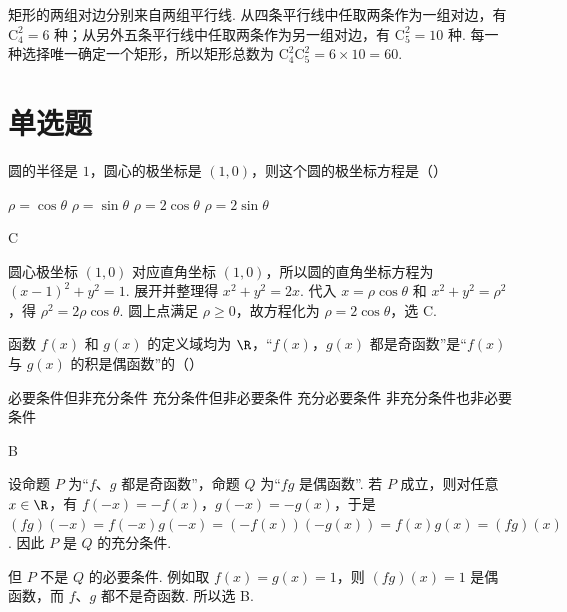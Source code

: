 \begin{solution}
矩形的两组对边分别来自两组平行线. 从四条平行线中任取两条作为一组对边，有 \(\mathrm C_4^2=6\) 种；从另外五条平行线中任取两条作为另一组对边，有 \(\mathrm C_5^2=10\) 种. 每一种选择唯一确定一个矩形，所以矩形总数为 \(\mathrm C_4^2\mathrm C_5^2=6\times10=60\).
\end{solution}

\section{单选题}

\begin{problem}
圆的半径是 \(1\)，圆心的极坐标是 \((1,0)\)，则这个圆的极坐标方程是（\quad）

\choices
    {\(\rho=\cos\theta\)}
    {\(\rho=\sin\theta\)}
    {\(\rho=2\cos\theta\)}
    {\(\rho=2\sin\theta\)}
\end{problem}

\begin{answer}
C
\end{answer}

\begin{solution}
圆心极坐标 \((1,0)\) 对应直角坐标 \((1,0)\)，所以圆的直角坐标方程为 \(\left(x-1\right)^2+y^2=1\). 展开并整理得 \(x^2+y^2=2x\). 代入 \(x=\rho\cos\theta\) 和 \(x^2+y^2=\rho^2\)，得 \(\rho^2=2\rho\cos\theta\). 圆上点满足 \(\rho\geq0\)，故方程化为 \(\rho=2\cos\theta\)，选 C.
\end{solution}

\begin{problem}
函数 \(f(x)\) 和 \(g(x)\) 的定义域均为 \(\R\)，“\(f(x)\)，\(g(x)\) 都是奇函数”是“\(f(x)\) 与 \(g(x)\) 的积是偶函数”的（\quad）

\choices
    {必要条件但非充分条件}
    {充分条件但非必要条件}
    {充分必要条件}
    {非充分条件也非必要条件}
\end{problem}

\begin{answer}
B
\end{answer}

\begin{solution}
设命题 \(P\) 为“\(f\)、\(g\) 都是奇函数”，命题 \(Q\) 为“\(fg\) 是偶函数”. 若 \(P\) 成立，则对任意 \(x\in\R\)，有 \(f(-x)=-f(x)\)，\(g(-x)=-g(x)\)，于是
\((fg)(-x)=f(-x)g(-x)=\left(-f(x)\right)\left(-g(x)\right)=f(x)g(x)=(fg)(x)\). 因此 \(P\) 是 \(Q\) 的充分条件.

但 \(P\) 不是 \(Q\) 的必要条件. 例如取 \(f(x)=g(x)=1\)，则 \((fg)(x)=1\) 是偶函数，而 \(f\)、\(g\) 都不是奇函数. 所以选 B.
\end{solution}

